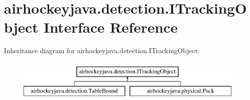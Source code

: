 \hypertarget{interfaceairhockeyjava_1_1detection_1_1_i_tracking_object}{}\section{airhockeyjava.\+detection.\+I\+Tracking\+Object Interface Reference}
\label{interfaceairhockeyjava_1_1detection_1_1_i_tracking_object}
Inheritance diagram for airhockeyjava.\+detection.\+I\+Tracking\+Object\+:\begin{figure}[H]
\begin{center}
\leavevmode
\includegraphics[height=2.000000cm]{interfaceairhockeyjava_1_1detection_1_1_i_tracking_object}
\end{center}
\end{figure}

